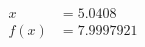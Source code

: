 \documentclass[preview]{standalone}
\begin{document}
\begin{align*}
x &= 5.0408\\f(x) &= 7.9997921
\end{align*}
\end{document}
